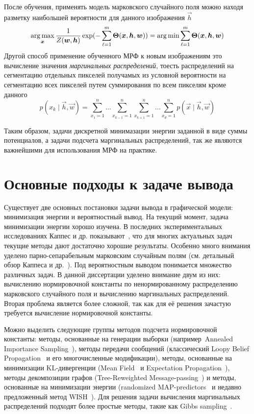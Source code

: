 После обучения, применять модель марковского случайного поля можно находя разметку наибольшей вероятности для данного изображения $\vec{h}$
$$\operatorname*{arg\,max}_{\boldsymbol{x}} \frac{1}{Z(\boldsymbol{w}, \boldsymbol{h})}\exp(-\sum_{\ell=1}^m \boldsymbol{\Theta}(\boldsymbol{x}, \boldsymbol{h}, \boldsymbol{w})) = \operatorname*{arg\,min} \sum_{\ell=1}^m\boldsymbol{\Theta}(\boldsymbol{x}, \boldsymbol{h}, \boldsymbol{w})$$	
Другой способ применение обученного МРФ к новым изображениям это вычисление значения \emph{маргинальных распределений}, тоесть распределений на сегментацию отдельных пикселей получамых из условной вероятности на сегментацию всех пикселей путем суммирования по всем пикселям кроме данного
$$
p(x_k \mid \vec{h}, \vec{w}) = \sum_{x_1=1}^n \ldots \sum_{x_{k-1}=1}^n\sum_{x_{k+1}=1}^n \ldots \sum_{x_{d}=1}^n p(\vec{x} \mid \vec{h}, \vec{w})
$$

Таким образом, задачи дискретной минимазации энергии заданной в виде суммы потенциалов, а задачи подсчета маргинальных распределений, так же являются важнейшими для использования МРФ на практике.

\section{Основные подходы к задаче вывода} \label{sec:mrf-approaches}

Существует две основных постановки задачи вывода в графической модели: минимизация энергии и вероятностный вывод.
На текущий момент, задача минимизации энергии хорошо изучена. В последних экспериментальных исследованиях Каппес и др. показывают~\cite{Kappes13comparison}, что для многих актуальных задач текущие методы дают достаточно хорошие результаты. Особенно много внимания уделено парно-сепарабельным марковским случайным полям (см. детальный обзор Каппеса и др.~\cite{Kappes13comparison}).
Под вероятностным выводом понимается множество различных задач. В данной диссертации уделено внимание двум из них: вычислению нормировочной константы по ненормированному распределению марковского случайного поля и вычислению маргинальных распределений.
Вторая проблема является более сложной, так как для её решения зачастую требуется вычисление нормировочной константы.

Можно выделить следующие группы методов подсчета нормировочной константы: методы, основанные на генерации выборки (например~Annealed Importance Sampling~\cite{neal01ais,grosse13}), методы передачи сообщений (классический Loopy Belief Propagation~\cite{kschischang01bp} и его многочисленные модификации), методы, основанные на минимизации KL\hyp{}дивергенции (Mean Field~\cite{wainwright08gm} и Expectation Propagation~\cite{minka04treeep}), методы декомпозиции графов (Tree\hyp{}Reweighted Message-passing~\cite{wainwright05trw}) и методы, основанные на минимизации энергии (randomized MAP\hyp{}predictors~\cite{hazan13} и недавно предложенный метод WISH~\cite{ermon13wish}).
Для решения задачи вычисления маргинальных распределений подходят более простые методы, такие как Gibbs sampling~\cite{wainwright08gm}.

